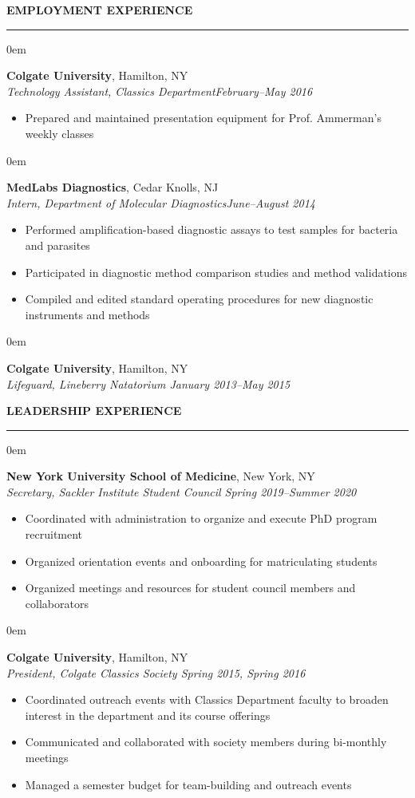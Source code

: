 \documentclass[11pt, letterpaper]{article}
\newenvironment{CVSection}{
\begin{addmargin}[2em]{0em}
\begin{samepage}}
{\end{samepage}
\end{addmargin}\bigskip}
\newcommand{\CVHeading}[1]{
\MakeUppercase{\bf #1}
\smallskip
\hrule
\medskip
}
\begin{document}
\CVHeading{Employment Experience}
\begin{CVSection}
\textbf{Colgate University}, Hamilton, NY\\
\textsl{Technology Assistant, Classics Department\hfill  February--May 2016}
\begin{itemize}
\item Prepared and maintained presentation equipment for Prof. Ammerman’s weekly classes
\end{itemize}
\end{CVSection}
\begin{CVSection}
\textbf{MedLabs Diagnostics}, Cedar Knolls, NJ\\
\textsl{Intern, Department of Molecular Diagnostics\hfill June--August 2014}
\begin{itemize}
\item Performed amplification-based diagnostic assays to test samples for bacteria and parasites
\item Participated in diagnostic method comparison studies and method validations
\item Compiled and edited standard operating procedures for new diagnostic instruments and methods
\end{itemize}
\end{CVSection}
\begin{CVSection}
\textbf{Colgate University}, Hamilton, NY\\
\textsl{Lifeguard, Lineberry Natatorium \hfill January 2013--May 2015}
\end{CVSection}

\CVHeading{Leadership Experience}
\begin{CVSection}
\textbf{New York University School of Medicine}, New York, NY\\
\textsl{Secretary, Sackler Institute Student Council	\hfill Spring 2019--Summer 2020}
\begin{itemize}
\item Coordinated with administration to organize and execute PhD program recruitment
\item Organized orientation events and onboarding for matriculating students
\item Organized meetings and resources for student council members and collaborators
\end{itemize}
\end{CVSection}
\begin{CVSection}
\textbf{Colgate University}, Hamilton, NY\\
\textsl{President, Colgate Classics Society	\hfill Spring 2015, Spring 2016}
\begin{itemize}
\item Coordinated outreach events with Classics Department faculty to broaden interest in the department and its course offerings
\item Communicated and collaborated with society members during bi-monthly meetings
\item Managed a semester budget for team-building and outreach events
\end{itemize}
\end{CVSection}
\end{document}
